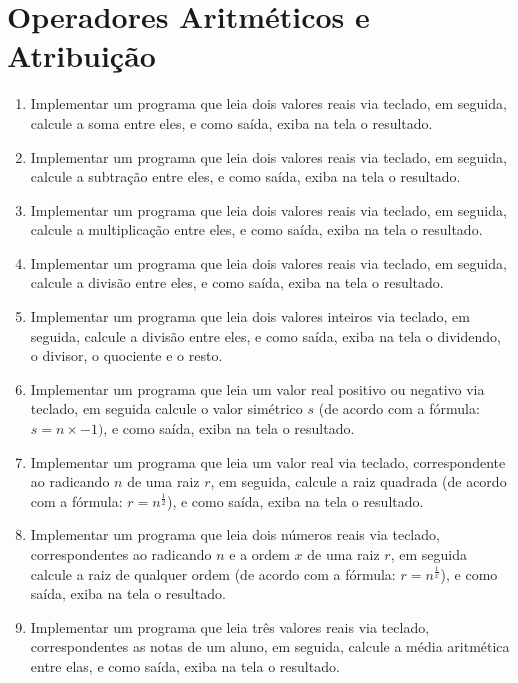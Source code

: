 \documentclass[11pt]{article}
\begin{document}
\newpage

\section{Operadores Aritméticos e Atribuição}

\begin{enumerate}
	\item Implementar um programa que leia dois valores reais via teclado, em seguida, calcule a soma
	entre eles, e como saída, exiba na tela o resultado.
	
	\item  Implementar um programa que leia dois valores reais via teclado, em seguida, calcule a subtração
	entre eles, e como saída, exiba na tela o resultado.
	
	\item Implementar um programa que leia dois valores reais via teclado, em seguida, calcule a
	multiplicação entre eles, e como saída, exiba na tela o resultado.
	
	\item  Implementar um programa que leia dois valores reais via teclado, em seguida, calcule a divisão
	entre eles, e como saída, exiba na tela o resultado.
	
	\item Implementar um programa que leia dois valores inteiros via teclado, em seguida, calcule a divisão
	entre eles, e como saída, exiba na tela o dividendo, o divisor, o quociente e o resto.
	
	\item Implementar um programa que leia um valor real positivo ou negativo via teclado, em seguida
	calcule o valor simétrico $s$ (de acordo com a fórmula: $s = n \times -1)$, e como saída, exiba na tela o
	resultado.
	
	\item Implementar um programa que leia um valor real via teclado, correspondente ao radicando $n$ de
	uma raiz $r$, em seguida, calcule a raiz quadrada (de acordo com a fórmula: $r = n^{\frac{1}{2}}$), e como
	saída, exiba na tela o resultado.
	
	\item  Implementar um programa que leia dois números reais via teclado, correspondentes ao radicando
	$n$ e a ordem $x$ de uma raiz $r$, em seguida calcule a raiz de qualquer ordem (de acordo com a
	fórmula: $r = n^{\frac{1}{x}}$), e como saída, exiba na tela o resultado.
	
	\item Implementar um programa que leia três valores reais via teclado, correspondentes as notas de um
	aluno, em seguida, calcule a média aritmética entre elas, e como saída, exiba na tela o resultado.
	

\end{enumerate}
\end{document}
